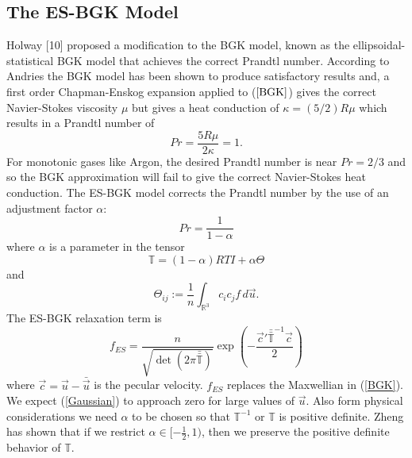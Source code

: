 \subsection{The ES-BGK Model}
Holway [10] proposed a modification to the BGK model, known as the ellipsoidal-statistical BGK model that achieves the correct Prandtl number. According to Andries \cite{andries} the BGK model has been shown to produce satisfactory results and, a first order Chapman-Enskog expansion applied to ($\ref{BGK}$) gives the correct Navier-Stokes viscosity $\mu$ but gives a heat conduction of $\kappa = (5/2)R \mu$ which results in a Prandtl number of
\begin{equation}
\label{Prandtl}
Pr = \frac{5 R \mu }{2 \kappa} = 1.
\end{equation}
%
For monotonic gases like Argon, the desired Prandtl number is near $Pr = 2/3$ and so the BGK approximation will fail to give the correct Navier-Stokes heat conduction. The ES-BGK model corrects the Prandtl number by the use of an adjustment factor $\alpha$:
%
\begin{equation}
Pr = \frac{1}{1 - \alpha}
\end{equation}
%
where $\alpha$ is a parameter in the tensor 
%
\begin{equation}
\mathbb{T} = (1-\alpha)RT I + \alpha \Theta
\end{equation}
%
and
%
\begin{equation}
\label{Theta}
\Theta_{ij} := \frac{1}{n} \int_{\mathbb{R}^{3}} c_i c_j f \, d\vec{u}.
\end{equation}
%
The ES-BGK relaxation term is
%
\begin{equation}
\label{Gaussian}
f_{ES} = \frac{n}{\sqrt{\det(2 \pi \bar{\bar{\mathbb{T}}})}}  \exp{\left(-\frac{\vec{c}' \bar{\bar{\mathbb{T}}}^{-1} \vec{c}}{2}\right)}
\end{equation}
%
where $\vec{c} = \vec{u} - \bar{\vec{u}}$ is the pecular velocity. $f_{ES}$ replaces the Maxwellian in (\ref{BGK}). We expect (\ref{Gaussian}) to approach zero for large values of $\vec{u}$. Also form physical considerations we need $\alpha$ to be chosen so that $\mathbb{T}^{-1}$ or $\mathbb{T}$ is positive definite. Zheng \cite{zheng} has shown that if we restrict $\alpha \in [-\frac{1}{2},1)$, then we preserve the positive definite behavior of $\mathbb{T}$.

